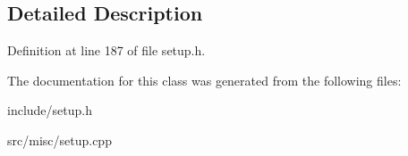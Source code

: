 \subsection{Detailed Description}


Definition at line 187 of file setup.\-h.



The documentation for this class was generated from the following files\-:\begin{DoxyCompactItemize}
\item 
include/setup.\-h\item 
src/misc/setup.\-cpp\end{DoxyCompactItemize}
